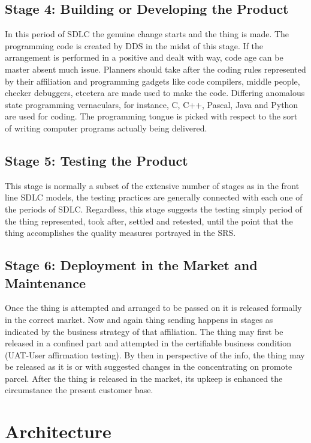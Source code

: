 \documentclass{book}
\begin{document}
    	\subsection{Stage 4: Building or Developing the Product}
    	In this period of SDLC the genuine change starts and the thing is made. The programming code is created by DDS in the midst of this stage. If the arrangement is performed in a positive and dealt with way, code age can be master absent much issue. Planners should take after the coding rules represented by their affiliation and programming gadgets like code compilers, middle people, checker debuggers, etcetera are made used to make the code. Differing anomalous state programming vernaculars, for instance, C, C++, Pascal, Java and Python are used for coding. The programming tongue is picked with respect to the sort of writing computer programs actually being delivered.
    	
    	\subsection{Stage 5: Testing the Product}
    	This stage is normally a subset of the extensive number of stages as in the front line SDLC models, the testing practices are generally connected with each one of the periods of SDLC. Regardless, this stage suggests the testing simply period of the thing represented, took after, settled and retested, until the point that the thing accomplishes the quality measures portrayed in the SRS.

    	\subsection{Stage 6: Deployment in the Market and Maintenance}
    	Once the thing is attempted and arranged to be passed on it is released formally in the correct market. Now and again thing sending happens in stages as indicated by the business strategy of that affiliation. The thing may first be released in a confined part and attempted in the certifiable business condition (UAT-User affirmation testing). By then in perspective of the info, the thing may be released as it is or with suggested changes in the concentrating on promote parcel. After the thing is released in the market, its upkeep is enhanced the circumstance the present customer base.
    	
    	\section{Architecture}
    	
\end{document}
